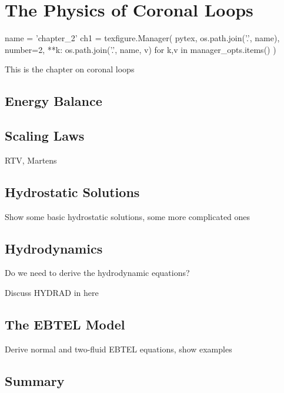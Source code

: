 \chapter{The Physics of Coronal Loops}\label{ch:loops}

\begin{pycode}[chapter_2]
name = 'chapter_2'
ch1 = texfigure.Manager(
    pytex,
    os.path.join('.', name),
    number=2,
    **{k: os.path.join('.', name, v) for k,v in manager_opts.items()}
)
\end{pycode}

This is the chapter on coronal loops

\section{Energy Balance}

\section{Scaling Laws}

RTV, Martens

\section{Hydrostatic Solutions}

Show some basic hydrostatic solutions, some more complicated ones

\section{Hydrodynamics}

Do we need to derive the hydrodynamic equations?

Discuss HYDRAD in here

\section{The EBTEL Model}

Derive normal and two-fluid EBTEL equations, show examples

\section{Summary}
